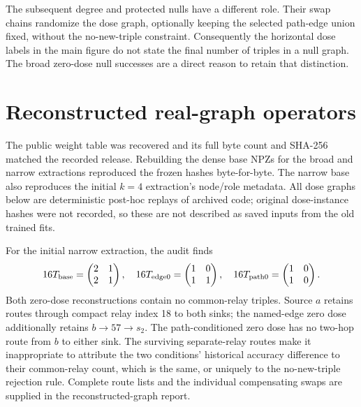 \documentclass[10pt,letterpaper]{article}
\begin{document}
The subsequent degree and protected nulls have a different role. Their
swap chains randomize the dose graph, optionally keeping the selected
path-edge union fixed, without the no-new-triple constraint. Consequently
the horizontal dose labels in the main figure do not state the final
number of triples in a null graph. The broad zero-dose null successes
are a direct reason to retain that distinction.

\section{Reconstructed real-graph operators}

The public weight table was recovered and its full byte count and SHA-256
matched the recorded release. Rebuilding the dense base NPZs for the broad
and narrow extractions reproduced the frozen hashes byte-for-byte. The
narrow base also reproduces the initial $k=4$ extraction's node/role
metadata. All dose graphs below are deterministic post-hoc replays of
archived code; original dose-instance hashes were not recorded, so these
are not described as saved inputs from the old trained fits.

For the initial narrow extraction, the audit finds
\[
16T_{\rm base}=\begin{pmatrix}2&1\\2&1\end{pmatrix},\quad
16T_{\rm edge0}=\begin{pmatrix}1&0\\1&1\end{pmatrix},\quad
16T_{\rm path0}=\begin{pmatrix}1&0\\1&0\end{pmatrix}.
\]
Both zero-dose reconstructions contain no common-relay triples. Source
$a$ retains routes through compact relay index 18 to both sinks; the
named-edge zero dose additionally retains $b\to57\to s_2$. The
path-conditioned zero dose has no two-hop route from $b$ to either sink.
The surviving separate-relay routes make it inappropriate to attribute
the two conditions' historical accuracy difference to their common-relay
count, which is the same, or uniquely to the no-new-triple rejection rule.
Complete route lists and the individual compensating swaps are supplied
in the reconstructed-graph report.
\end{document}
